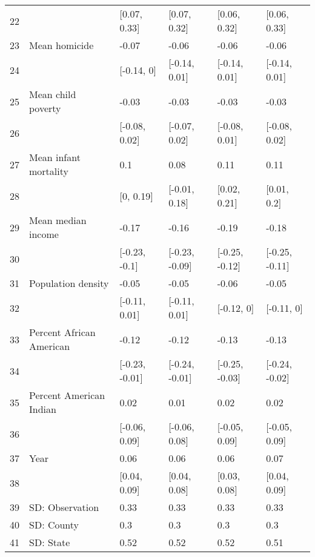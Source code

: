 \begin{table}[ht]
\begin{tabular}{rlllll}
  22 &  & [0.07, 0.33] & [0.07, 0.32] & [0.06, 0.32] & [0.06, 0.33] \\ 
  23 & Mean homicide & -0.07 & -0.06 & -0.06 & -0.06 \\ 
  24 &  & [-0.14, 0] & [-0.14, 0.01] & [-0.14, 0.01] & [-0.14, 0.01] \\ 
  25 & Mean child poverty & -0.03 & -0.03 & -0.03 & -0.03 \\ 
  26 &  & [-0.08, 0.02] & [-0.07, 0.02] & [-0.08, 0.01] & [-0.08, 0.02] \\ 
  27 & Mean infant mortality & 0.1 & 0.08 & 0.11 & 0.11 \\ 
  28 &  & [0, 0.19] & [-0.01, 0.18] & [0.02, 0.21] & [0.01, 0.2] \\ 
  29 & Mean median income & -0.17 & -0.16 & -0.19 & -0.18 \\ 
  30 &  & [-0.23, -0.1] & [-0.23, -0.09] & [-0.25, -0.12] & [-0.25, -0.11] \\ 
  31 & Population density & -0.05 & -0.05 & -0.06 & -0.05 \\ 
  32 &  & [-0.11, 0.01] & [-0.11, 0.01] & [-0.12, 0] & [-0.11, 0] \\ 
  33 & Percent African American & -0.12 & -0.12 & -0.13 & -0.13 \\ 
  34 &  & [-0.23, -0.01] & [-0.24, -0.01] & [-0.25, -0.03] & [-0.24, -0.02] \\ 
  35 & Percent American Indian & 0.02 & 0.01 & 0.02 & 0.02 \\ 
  36 &  & [-0.06, 0.09] & [-0.06, 0.08] & [-0.05, 0.09] & [-0.05, 0.09] \\ 
  37 & Year & 0.06 & 0.06 & 0.06 & 0.07 \\ 
  38 &  & [0.04, 0.09] & [0.04, 0.08] & [0.03, 0.08] & [0.04, 0.09] \\ 
  39 & SD: Observation & 0.33 & 0.33 & 0.33 & 0.33 \\ 
  40 & SD: County & 0.3 & 0.3 & 0.3 & 0.3 \\ 
  41 & SD: State & 0.52 & 0.52 & 0.52 & 0.51 \\ 
   \hline
\end{tabular}
\end{table}
